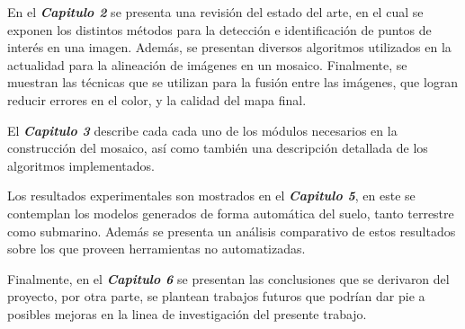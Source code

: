 En el \textit{\textbf{Capitulo 2}} se presenta una revisión del estado del arte, en el cual se exponen los distintos métodos para la detección e identificación de puntos de interés en una imagen. Además, se presentan diversos algoritmos utilizados en la actualidad para la alineación de imágenes en un mosaico. Finalmente, se muestran las técnicas que se utilizan para la fusión entre las imágenes, que logran reducir errores en el color, y la calidad del mapa final.

El \textit{\textbf{Capitulo 3}} describe cada cada uno de los módulos necesarios en la construcción del mosaico, así como también una descripción detallada de los algoritmos implementados.

Los resultados experimentales son mostrados en el \textit{\textbf{Capitulo 5}}, en este se contemplan los modelos generados de forma automática del suelo, tanto terrestre como submarino. Además se presenta un análisis comparativo de estos resultados sobre los que proveen herramientas no automatizadas.

Finalmente, en el \textit{\textbf{Capitulo 6}} se presentan las conclusiones que se derivaron del proyecto, por otra parte, se plantean trabajos futuros que podrían dar pie a posibles mejoras en la linea de investigación del presente trabajo.